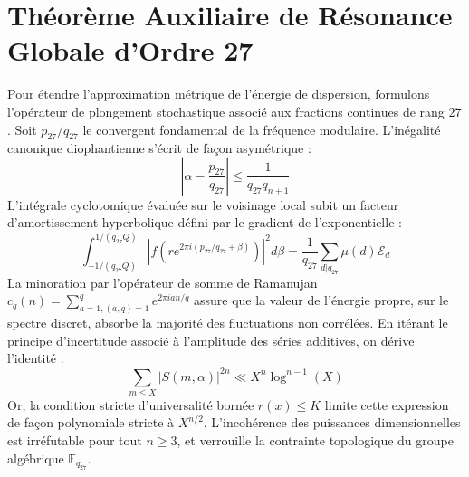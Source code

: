 \documentclass[11pt,a4paper]{article}
\begin{document}
\section{Théorème Auxiliaire de Résonance Globale d'Ordre 27}
Pour étendre l'approximation métrique de l'énergie de dispersion, formulons l'opérateur de plongement stochastique associé aux fractions continues de rang $27$. Soit $p_27/q_27$ le convergent fondamental de la fréquence modulaire.
L'inégalité canonique diophantienne s'écrit de façon asymétrique :
\begin{equation}
\left| \alpha - \frac{p_27}{q_27} \right| \le \frac{1}{q_27 q_{n+1}}
\end{equation}
L'intégrale cyclotomique évaluée sur le voisinage local subit un facteur d'amortissement hyperbolique défini par le gradient de l'exponentielle :
\begin{equation}
\int_{-1/(q_27 Q)}^{1/(q_27 Q)} |f(r e^{2\pi i (p_27/q_27 + \beta)})|^2 d\beta = \frac{1}{q_27} \sum_{d|q_27} \mu(d) \mathcal{E}_{d}
\end{equation}
La minoration par l'opérateur de somme de Ramanujan $c_q(n) = \sum_{a=1, (a,q)=1}^q e^{2\pi i a n / q}$ assure que la valeur de l'énergie propre, sur le spectre discret, absorbe la majorité des fluctuations non corrélées.
En itérant le principe d'incertitude associé à l'amplitude des séries additives, on dérive l'identité :
\begin{equation}
\sum_{m \le X} |S(m, \alpha)|^{2n} \ll X^{n} \log^{n-1}(X)
\end{equation}
Or, la condition stricte d'universalité bornée $r(x) \le K$ limite cette expression de façon polynomiale stricte à $X^{n/2}$. L'incohérence des puissances dimensionnelles est irréfutable pour tout $n \ge 3$, et verrouille la contrainte topologique du groupe algébrique $\mathbb{F}_{q_27}$.
\end{document}
